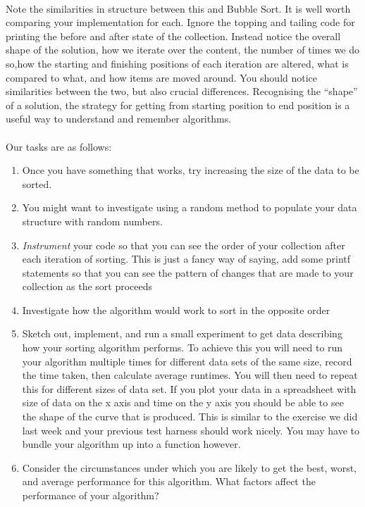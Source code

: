 \documentclass[10pt, a4paper, twosize]{article}
\begin{document}
\paragraph{}  Note the similarities in structure between this and Bubble Sort. It is well worth comparing your implementation for each. Ignore the topping and tailing code for printing the before and after state of the collection. Instead notice the overall shape of the solution, how we iterate over the content, the number of times we do so,how the starting and finishing positions of each iteration are altered, what is compared to what, and how items are moved around. You should notice similarities between the two, but also crucial differences. Recognising the ``shape'' of a solution, the strategy for getting from starting position to end position is a useful way to understand and remember algorithms.

\paragraph{} Our tasks are as follows:
\begin{enumerate}
\item Once you have something that works, try increasing the size of the data to be sorted.
\item You might want to investigate using a random method to populate your data structure with random numbers.
\item \emph{Instrument} your code so that you can see the order of your collection after each iteration of sorting. This is just a fancy way of saying, add some printf statements so that you can see the pattern of changes that are made to your collection as the sort proceeds
\item Investigate how the algorithm would work to sort in the opposite order
\item Sketch out, implement, and run a small experiment to get data describing how your sorting algorithm performs. To achieve this you will need to run your algorithm multiple times for different data sets of the same size, record the time taken, then calculate average runtimes. You will then need to repeat this for different sizes of data set. If you plot your data in a spreadsheet with size of data on the x axis and time on the y axis you should be able to see the shape of the curve that is produced. This is similar to the exercise we did last week and your previous test harness should work nicely. You may have to bundle your algorithm up into a function however.
\item Consider the circumstances under which you are likely to get the best, worst, and average performance for this algorithm. What factors affect the performance of your algorithm?
\end{enumerate}
\end{document}
